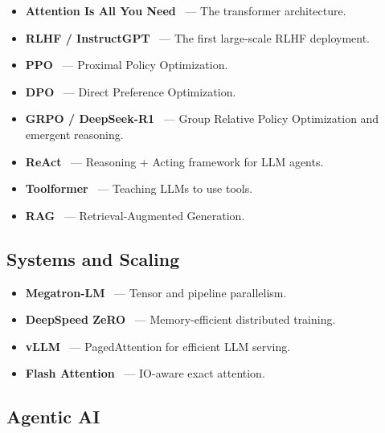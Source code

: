 \begin{itemize}
  \item \textbf{Attention Is All You Need}~\cite{vaswani2017attention} --- The transformer architecture.
  \item \textbf{RLHF / InstructGPT}~\cite{ouyang2022training} --- The first large-scale RLHF deployment.
  \item \textbf{PPO}~\cite{schulman2017proximal} --- Proximal Policy Optimization.
  \item \textbf{DPO}~\cite{rafailov2023direct} --- Direct Preference Optimization.
  \item \textbf{GRPO / DeepSeek-R1}~\cite{shao2024deepseekmath, deepseek2025r1} --- Group Relative Policy Optimization and emergent reasoning.
  \item \textbf{ReAct}~\cite{yao2023react} --- Reasoning + Acting framework for LLM agents.
  \item \textbf{Toolformer}~\cite{schick2023toolformer} --- Teaching LLMs to use tools.
  \item \textbf{RAG}~\cite{lewis2020retrieval} --- Retrieval-Augmented Generation.
\end{itemize}

\subsection{Systems and Scaling}
\label{systems-and-scaling}

\begin{itemize}
  \item \textbf{Megatron-LM}~\cite{shoeybi2019megatron} --- Tensor and pipeline parallelism.
  \item \textbf{DeepSpeed ZeRO}~\cite{rajbhandari2020zero} --- Memory-efficient distributed training.
  \item \textbf{vLLM}~\cite{kwon2023efficient} --- PagedAttention for efficient LLM serving.
  \item \textbf{Flash Attention}~\cite{dao2022flashattention} --- IO-aware exact attention.
\end{itemize}

\subsection{Agentic AI}
\label{agentic-ai}

